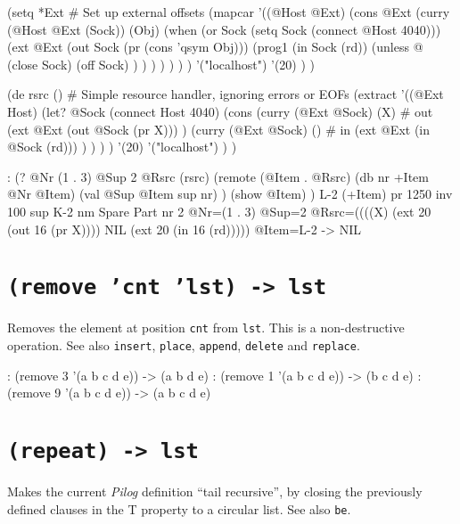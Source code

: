 \begin{wideverbatim}
(setq *Ext           # Set up external offsets
   (mapcar
      '((@Host @Ext)
         (cons @Ext
            (curry (@Host @Ext (Sock)) (Obj)
               (when (or Sock (setq Sock (connect @Host 4040)))
                  (ext @Ext
                     (out Sock (pr (cons 'qsym Obj)))
                     (prog1 (in Sock (rd))
                        (unless @
                           (close Sock)
                           (off Sock) ) ) ) ) ) ) )
      '("localhost")
      '(20) ) )

(de rsrc ()  # Simple resource handler, ignoring errors or EOFs
   (extract
      '((@Ext Host)
         (let? @Sock (connect Host 4040)
            (cons
               (curry (@Ext @Sock) (X)  # out
                  (ext @Ext (out @Sock (pr X))) )
               (curry (@Ext @Sock) ()  # in
                  (ext @Ext (in @Sock (rd))) ) ) ) )
      '(20)
      '("localhost") ) )

: (?
   @Nr (1 . 3)
   @Sup 2
   @Rsrc (rsrc)
   (remote (@Item . @Rsrc)
      (db nr +Item @Nr @Item)
      (val @Sup @Item sup nr) )
   (show @Item) )
{L-2} (+Item)
   pr 1250
   inv 100
   sup {K-2}
   nm Spare Part
   nr 2
 @Nr=(1 . 3) @Sup=2 @Rsrc=((((X) (ext 20 (out 16 (pr X)))) NIL (ext 20 (in 16 (rd))))) @Item={L-2}
-> NIL
\end{wideverbatim}

 
\section*{\texttt{(remove 'cnt 'lst) -> lst}}
\label{sec:func-ref-R-(remove 'cnt 'lst) -> lst}


Removes the element at position \texttt{cnt} from \texttt{lst}. This is a
non-destructive operation. See also \texttt{insert}, \texttt{place}, \texttt{append},
\texttt{delete} and \texttt{replace}.


\begin{wideverbatim}
: (remove 3 '(a b c d e))
-> (a b d e)
: (remove 1 '(a b c d e))
-> (b c d e)
: (remove 9 '(a b c d e))
-> (a b c d e)
\end{wideverbatim}

 
\section*{\texttt{(repeat) -> lst}}
\label{sec:func-ref-R-(repeat) -> lst}


Makes the current \emph{Pilog} definition ``tail recursive'',
by closing the previously defined clauses in the T property to a
circular list. See also \texttt{be}.


